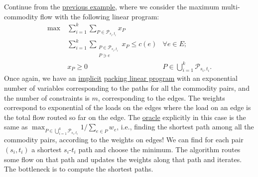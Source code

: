 \begin{eg}
	Continue from the \hyperref[eg:maximum-multi-commodity-flow-MWU]{previous example}, where we consider the maximum multi-commodity flow with the following linear program:
	\[
		\begin{aligned}
			\max~ & \sum_{i=1}^{k} \sum_{P \in \mathcal{P} _{s_i, t_i}} x_P                                                         \\
			      & \sum_{i=1}^{k} \sum_{\substack{P \in\mathcal{P} _{s_i, t_i}                                                     \\ P \ni e}} x_P \leq c(e) & \forall e \in E ;                                  \\
			      & x_P \geq 0                                                  & P \in \bigcup_{i=1}^{k} \mathcal{P} _{s_i, t_i} .
		\end{aligned}
	\]
	Once again, we have an \hyperref[def:implicit-LP]{implicit} \hyperref[def:packing-LP]{packing linear program} with an exponential number of variables corresponding to the paths for all the commodity pairs, and the number of constraints is \(m\), corresponding to the edges. The weights correspond to exponential of the loads on the edges where the load on an edge is the total flow routed so far on the edge. The \hyperref[eq:MWU-oracle-LP]{oracle} explicitly in this case is the same as \(\max _{P \in \bigcup_{i=1}^{k} \mathcal{P} _{s_i, t_i}} 1 / \sum_{e \in P} w_e\), i.e., finding the shortest path among all the commodity pairs, according to the weights on edges! We can find for each pair \((s_i, t_i)\) a shortest \(s_i\)-\(t_i\) path and choose the minimum. The algorithm routes some flow on that path and updates the weights along that path and iterates. The bottleneck is to compute the shortest paths.
\end{eg}